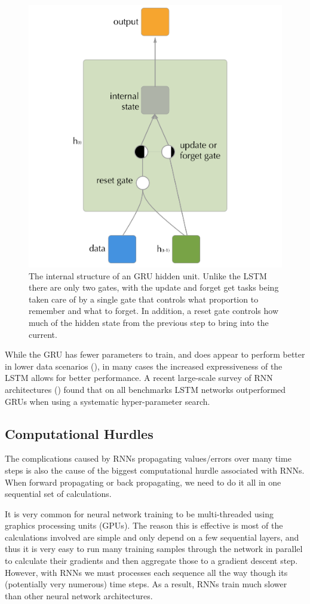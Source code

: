 \documentclass[]{book}
\theoremstyle{definition}
\theoremstyle{definition}
\theoremstyle{definition}
\theoremstyle{remark}
\begin{document}
\begin{figure}

{\centering \includegraphics[width=0.6\linewidth]{figures/gru_cell} 

}

\caption{The internal structure of an GRU hidden unit. Unlike the LSTM there are only two gates, with the update and forget get tasks being taken care of by a single gate that controls what proportion to remember and what to forget. In addition, a reset gate controls how much of the hidden state from the previous step to bring into the current.}\label{fig:grudiagram}
\end{figure}

While the GRU has fewer parameters to train, and does appear to perform
better in lower data scenarios (\citet{graves_rnn}), in many cases the
increased expressiveness of the LSTM allows for better performance. A
recent large-scale survey of RNN architectures (\citet{rnn_survey})
found that on all benchmarks LSTM networks outperformed GRUs when using
a systematic hyper-parameter search.

\subsection{Computational Hurdles}\label{computational-hurdles}

The complications caused by RNNs propagating values/errors over many
time steps is also the cause of the biggest computational hurdle
associated with RNNs. When forward propagating or back propagating, we
need to do it all in one sequential set of calculations.

It is very common for neural network training to be multi-threaded using
graphics processing units (GPUs). The reason this is effective is most
of the calculations involved are simple and only depend on a few
sequential layers, and thus it is very easy to run many training samples
through the network in parallel to calculate their gradients and then
aggregate those to a gradient descent step. However, with RNNs we must
processes each sequence all the way though its (potentially very
numerous) time steps. As a result, RNNs train much slower than other
neural network architectures.
\end{document}
